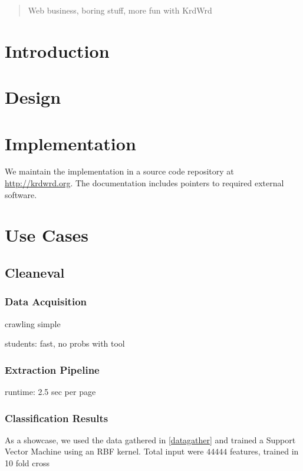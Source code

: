 \begin{abstract}
Web business, boring stuff, more fun with KrdWrd
\end{abstract}

\section{Introduction}


\section{Design}


\section{Implementation}

We maintain the implementation in a source code repository at \url{http://krdwrd.org}.
The documentation includes pointers to required external software.



\section{Use Cases}

\subsection{Cleaneval}
\subsubsection{Data Acquisition\label{datagather}}
crawling simple

students: fast, no probs with tool

\subsubsection{Extraction Pipeline}

runtime: 2.5 sec per page

\subsubsection{Classification Results}

As a showcase, we used the data gathered in \ref{datagather} and trained a Support Vector Machine \cite{libsvm} using an RBF kernel.
Total input were $44444$ features, trained in 10 fold cross

